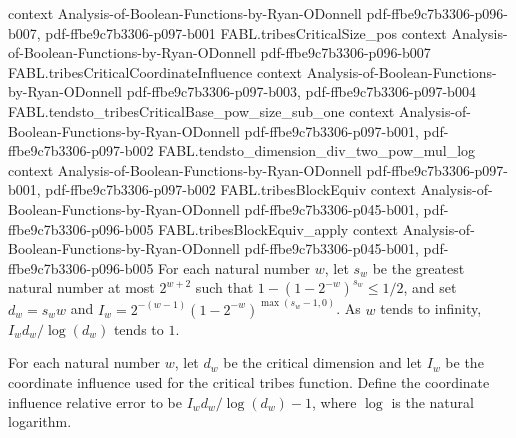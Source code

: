 \begin{theorem}
  {context}
  {Analysis-of-Boolean-Functions-by-Ryan-ODonnell}
  {pdf-ffbe9c7b3306-p096-b007,
    pdf-ffbe9c7b3306-p097-b001}
\proofstep
  {FABL.tribesCriticalSize_pos}
  {context}
  {Analysis-of-Boolean-Functions-by-Ryan-ODonnell}
  {pdf-ffbe9c7b3306-p096-b007}
\proofstep
  {FABL.tribesCriticalCoordinateInfluence}
  {context}
  {Analysis-of-Boolean-Functions-by-Ryan-ODonnell}
  {pdf-ffbe9c7b3306-p097-b003,
    pdf-ffbe9c7b3306-p097-b004}
\proofstep
  {FABL.tendsto_tribesCriticalBase_pow_size_sub_one}
  {context}
  {Analysis-of-Boolean-Functions-by-Ryan-ODonnell}
  {pdf-ffbe9c7b3306-p097-b001,
    pdf-ffbe9c7b3306-p097-b002}
\proofstep
  {FABL.tendsto_dimension_div_two_pow_mul_log}
  {context}
  {Analysis-of-Boolean-Functions-by-Ryan-ODonnell}
  {pdf-ffbe9c7b3306-p097-b001,
    pdf-ffbe9c7b3306-p097-b002}
\proofstep
  {FABL.tribesBlockEquiv}
  {context}
  {Analysis-of-Boolean-Functions-by-Ryan-ODonnell}
  {pdf-ffbe9c7b3306-p045-b001,
    pdf-ffbe9c7b3306-p096-b005}
\proofstep
  {FABL.tribesBlockEquiv_apply}
  {context}
  {Analysis-of-Boolean-Functions-by-Ryan-ODonnell}
  {pdf-ffbe9c7b3306-p045-b001,
    pdf-ffbe9c7b3306-p096-b005}
For each natural number $w$, let $s_w$ be the greatest natural number at most $2^{w+2}$
such that $1-(1-2^{-w})^{s_w}\le 1/2$, and set $d_w=s_w w$ and
$I_w=2^{-(w-1)}(1-2^{-w})^{\max(s_w-1,0)}$. As $w$ tends to infinity, $I_w
d_w/\log(d_w)$ tends to $1$.
\end{theorem}

\begin{definition}
\label{FABL.tribesCriticalCoordinateInfluenceRelativeError}
\leanok
{}
For each natural number $w$, let $d_w$ be the critical dimension and let $I_w$ be the
coordinate influence used for the critical tribes function. Define the coordinate
influence relative error to be $I_w d_w/\log(d_w)-1$, where $\log$ is the natural
logarithm.
\end{definition}

